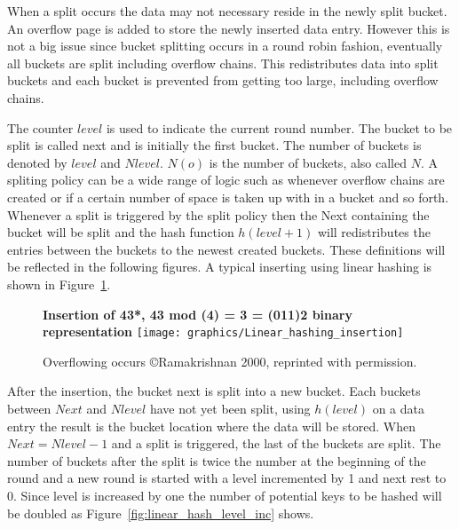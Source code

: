 \documentclass[letterpaper, 11pt]{article}
\begin{document}
When a split occurs the data may not necessary reside in the newly split bucket. An overflow page is
added to store the newly inserted data entry. However this is not a big issue since bucket splitting
occurs in a round robin fashion, eventually all buckets are split including overflow chains.
This redistributes data into split buckets and each bucket is prevented from getting too large,
including overflow chains.
\par\vspace{\baselineskip}

The counter $level$ is used to indicate the current round number. The bucket to be split is called
next and is initially the first bucket. The number of buckets is denoted by $level$ and $Nlevel$.
$N(o)$ is the number of buckets, also called $N$. A spliting policy can be a wide range of logic
such as whenever overflow chains are created or if a certain number of space is taken up with
in a bucket and so forth. Whenever a split is triggered by the split policy then the Next containing
the bucket will be split and the hash function $h(level+1)$ will redistributes the entries
between the buckets to the newest created buckets. These definitions will be reflected in the following
figures. A typical inserting using linear hashing is shown in Figure~\ref{fig:linear_hash_insert}.
\par\vspace{\baselineskip}

\begin{figure}[H]
  \centering
  \textbf{Insertion of 43*, 43 mod (4) = 3 = (011)2 binary representation}
  \texttt{[image: graphics/Linear\_hashing\_insertion]}
  \caption{Overflowing occurs \copyright Ramakrishnan 2000, reprinted with \newline permission.\cite{ramakrishnan2000database}}
  \label{fig:linear_hash_insert}
\end{figure}

After the insertion, the bucket next is split into a new bucket. Each buckets between $Next$ and $Nlevel$ have not yet been split,
using $h(level)$ on a data entry the result is the bucket location where the data will be stored.
When $Next = Nlevel - 1$ and a split is triggered, the last of the buckets are split. The 
number of buckets after the split is twice the number at the beginning of the round and a new round is 
started with a level incremented by 1 and next rest to 0. Since level is increased by one the number 
of potential keys to be hashed will be doubled as Figure~\ref{fig:linear_hash_level_inc} shows.
\par\vspace{\baselineskip}
\end{document}
